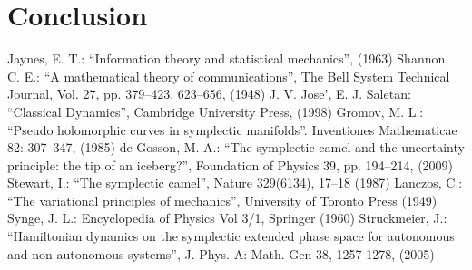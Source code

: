 \documentclass[aps,pra,10pt,twocolumn,floatfix,nofootinbib]{revtex4-1}
\theoremstyle{definition}
\begin{document}
\section{Conclusion}

\begin{thebibliography}{0}

 Jaynes, E. T.: ``Information theory and statistical mechanics'', (1963)
 Shannon, C. E.: ``A mathematical theory of communications'', The Bell System Technical Journal, Vol. 27, pp. 379–423, 623–656, (1948)
 J. V. Jose', E. J. Saletan: ``Classical Dynamics'', Cambridge University Press, (1998)
 Gromov, M. L.: ``Pseudo holomorphic curves in symplectic manifolds''. Inventiones Mathematicae 82: 307–347, (1985)
 de Gosson, M. A.: ``The symplectic camel and the uncertainty principle: the tip of an iceberg?'', Foundation of Physics 39, pp. 194–214, (2009)
 Stewart, I.: ``The symplectic camel'', Nature 329(6134), 17–18 (1987)
 Lanczos, C.: ``The variational principles of mechanics'', University of Toronto Press (1949)
 Synge, J. L.: Encyclopedia of Physics Vol 3/1, Springer (1960)
 Struckmeier, J.: ``Hamiltonian dynamics on the symplectic extended phase space for autonomous and non-autonomous systems'', J. Phys. A: Math. Gen 38, 1257-1278, (2005)

\end{thebibliography}
\end{document}
